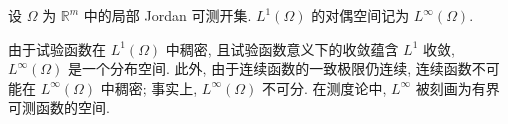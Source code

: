 \begin{Definition}
\label{def:lp-infinity-dual-space}
设 $\Omega$ 为 $\mathbb{R}^m$ 中的局部 Jordan 可测开集. $L^1(\Omega)$ 的对偶空间记为 $L^\infty(\Omega)$.
\end{Definition}

由于试验函数在 $L^1(\Omega)$ 中稠密, 且试验函数意义下的收敛蕴含 $L^1$ 收敛, $L^\infty(\Omega)$ 是一个分布空间. 此外, 由于连续函数的一致极限仍连续, 连续函数不可能在 $L^\infty(\Omega)$ 中稠密; 事实上, $L^\infty(\Omega)$ 不可分. 在测度论中, $L^\infty$ 被刻画为有界可测函数的空间.
